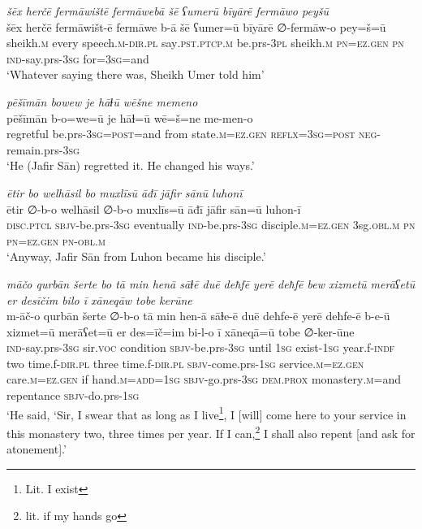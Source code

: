\ea \label{ŠJ.94}
\textit{šēx herčē fermāwištē fermāwebā šē ʕumerū bīyārē fermāwo peyšū} \\ 
\gll šēx herčē fermāwišt-ē fermāwe b-ā šē ʕumer=ū bīyārē ∅-fermāw-o pey=š=ū \\ 
 sheikh\textsc{.m} every speech\textsc{.m}\textsc{-dir}\textsc{.pl} say\textsc{.pst}\textsc{.ptcp}\textsc{.m} be.prs\textsc{-3pl} sheikh\textsc{.m} \textsc{pn}\textsc{=ez.gen} \textsc{pn} \textsc{ind-}say.prs\textsc{-3sg} for\textsc{=3sg}=and \\ 
\glt `Whatever saying there was, Sheikh Umer told him'
\z 
 
\ea \label{ŠJ.95}
\textit{pēšīmān bowew je hāɫū wēšne memeno} \\ 
\gll pēšīmān b-o=we=ū je hāɫ=ū wē=š=ne me-men-o \\ 
 regretful be.prs\textsc{-3sg}\textsc{=\textsc{post}}=and from state\textsc{.m}\textsc{=ez.gen} \textsc{reflx}\textsc{=3sg}\textsc{=\textsc{post}} \textsc{neg-}remain.prs\textsc{-3sg} \\ 
\glt `He (Jafir Sān) regretted it. He changed his ways.'
\z 
 
\ea \label{ŠJ.97}
\textit{ētir bo welhāsil bo muxlīsū āđī jāfir sānū luhonī} \\ 
\gll ētir ∅-b-o welhāsil ∅-b-o muxlīs=ū āđī jāfir sān=ū luhon-ī \\ 
 \textsc{disc.ptcl} \textsc{sbjv-}be.prs\textsc{-3sg} eventually \textsc{ind-}be.prs\textsc{-3sg} disciple\textsc{.m}\textsc{=ez.gen} 3sg\textsc{.obl}\textsc{.m} \textsc{pn} \textsc{pn}\textsc{=ez.gen} \textsc{pn}\textsc{-obl}\textsc{.m} \\ 
\glt `Anyway, Jafir Sān from Luhon became his disciple.'
\z 
 
\ea \label{ŠJ.98}
\textit{māčo qurbān šerte bo tā min henā sāɫē duē deħfē yerē deħfē bew xizmetū merāʕetū er desīčim bilo ī xāneqāw tobe kerūne} \\ 
\gll m-āč-o qurbān šerte ∅-b-o tā min hen-ā sāɫe-ē duē deħfe-ē yerē deħfe-ē b-e-ū xizmet=ū merāʕet=ū er des=īč=im bi-l-o ī xāneqā=ū tobe ∅-ker-ūne \\ 
 \textsc{ind-}say.prs\textsc{-3sg} sir.\textsc{voc} condition \textsc{sbjv-}be.prs\textsc{-3sg} until \textsc{1sg} exist\textsc{-\textsc{1sg}} year.f\textsc{-indf} two time.f\textsc{-dir}\textsc{.pl} three time.f\textsc{-dir}\textsc{.pl} \textsc{sbjv-}come.prs\textsc{-\textsc{1sg}} service\textsc{.m}\textsc{=ez.gen} care\textsc{.m}\textsc{=ez.gen} if hand\textsc{.m}\textsc{=add}\textsc{=\textsc{1sg}} \textsc{sbjv-}go.prs\textsc{-3sg} \textsc{dem.prox} monastery\textsc{.m}=and repentance \textsc{sbjv-}do.prs\textsc{-\textsc{1sg}} \\ 
\glt `He said, ‘Sir, I swear that as long as I live\footnote{Lit. I exist}, I [will] come here to your service in this monastery two, three times per year. If I can,\footnote{lit. if my hands go} I shall also repent [and ask for atonement].'
\z 
 
